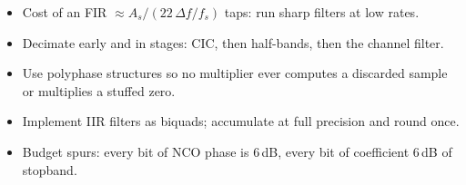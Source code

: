 
\begin{keyidea}[title=Rules of thumb for radio DSP]
\begin{itemize}
\item Cost of an FIR $\approx A_s/(22\,\Delta f/f_s)$ taps: run sharp filters at low rates.
\item Decimate early and in stages: CIC, then half-bands, then the channel filter.
\item Use polyphase structures so no multiplier ever computes a discarded sample or multiplies a
stuffed zero.
\item Implement IIR filters as biquads; accumulate at full precision and round once.
\item Budget spurs: every bit of NCO phase is 6\,dB, every bit of coefficient 6\,dB of stopband.
\end{itemize}
\end{keyidea}

